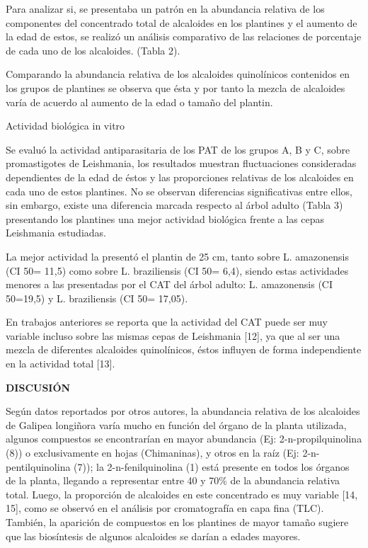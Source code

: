 \documentclass{article}
\begin{document}
Para analizar si, se presentaba un patrón en la abundancia relativa de los
componentes del concentrado total de alcaloides en los plantines y el aumento de
la edad de estos, se realizó un análisis comparativo de las relaciones de
porcentaje de cada uno de los alcaloides. (Tabla 2).

\begin{Center}

\end{Center}

Comparando la abundancia relativa de los alcaloides quinolínicos contenidos en
los grupos de plantines se observa que ésta y por tanto la mezcla de alcaloides
varía de acuerdo al aumento de la edad o tamaño del plantin.

Actividad biológica in vitro

Se evaluó la actividad antiparasitaria de los PAT de los grupos A, B y C, sobre
promastigotes de Leishmania, los resultados muestran fluctuaciones consideradas
dependientes de la edad de éstos y las proporciones relativas de los alcaloides
en cada uno de estos plantines. No se observan diferencias significativas entre
ellos, sin embargo, existe una diferencia marcada respecto al árbol adulto
(Tabla 3) presentando los plantines una mejor actividad biológica frente a las
cepas Leishmania estudiadas.

La mejor actividad la presentó el plantin de 25 cm, tanto sobre L. amazonensis
(CI 50= 11,5) como sobre L. braziliensis (CI 50= 6,4), siendo estas actividades
menores a las presentadas por el CAT del árbol adulto: L. amazonensis (CI
50=19,5) y L. braziliensis (CI 50= 17,05).

\begin{Center}

\end{Center}

En trabajos anteriores se reporta que la actividad del CAT puede ser muy
variable incluso sobre las mismas cepas de Leishmania [12], ya que al ser una
mezcla de diferentes alcaloides quinolínicos, éstos influyen de forma
independiente en la actividad total [13].

\textbf{DISCUSIÓN}

Según datos reportados por otros autores, la abundancia relativa de los
alcaloides de Galipea longiñora varía mucho en función del órgano de la planta
utilizada, algunos compuestos se encontrarían en mayor abundancia (Ej:
2-n-propilquinolina (8)) o exclusivamente en hojas (Chimaninas), y otros en la
raíz (Ej: 2-n-pentilquinolina (7)); la 2-n-fenilquinolina (1) está presente en
todos los órganos de la planta, llegando a representar entre 40 y 70\% de la
abundancia relativa total. Luego, la proporción de alcaloides en este
concentrado es muy variable [14, 15], como se observó en el análisis por
cromatografía en capa fina (TLC). También, la aparición de compuestos en los
plantines de mayor tamaño sugiere que las biosíntesis de algunos alcaloides se
darían a edades mayores.
\end{document}
